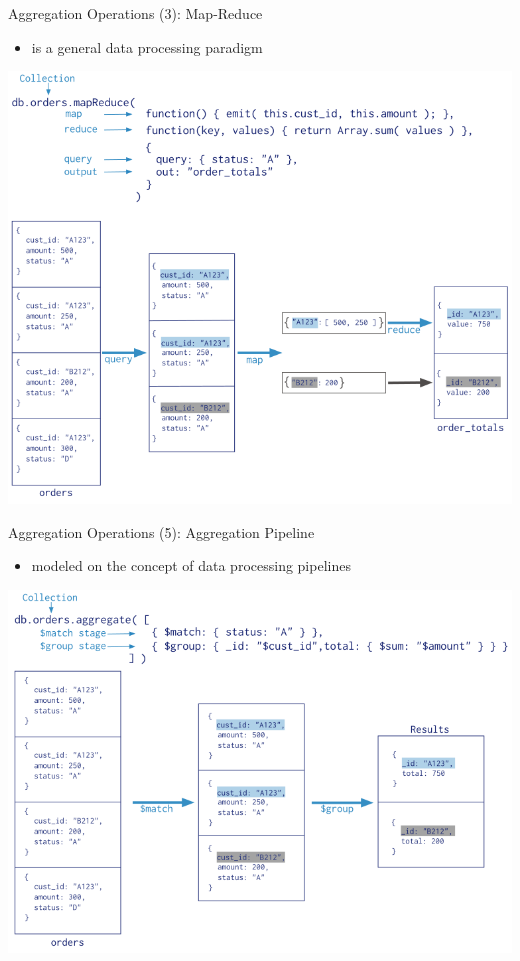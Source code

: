 \begin{frame}{Aggregation Operations (3): Map-Reduce}
  \begin{itemize}
    \item is a general data processing paradigm
  \end{itemize}
  \begin{center}
    \includegraphics[width=0.8\textheight]{imgs/map-reduce.png}
  \end{center}
\end{frame}

\begin{frame}{Aggregation Operations (5): Aggregation Pipeline}
  \begin{itemize}
    \item modeled on the concept of data processing pipelines
  \end{itemize}
  \begin{center}
    \includegraphics[width=0.8\textheight]{imgs/aggregation-pipeline.png}
  \end{center}
\end{frame}
